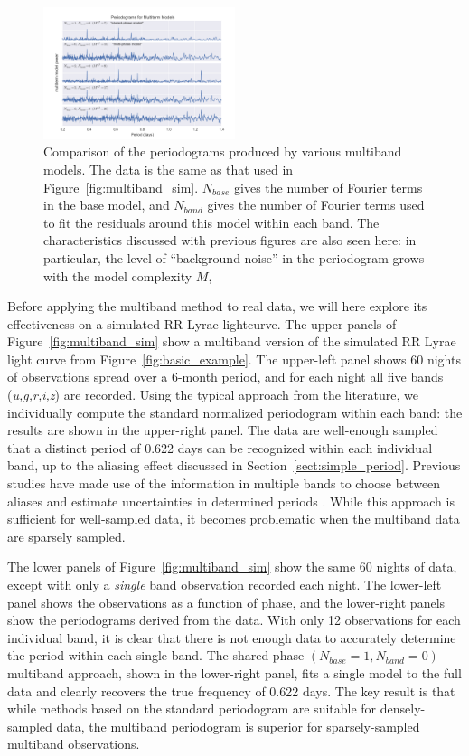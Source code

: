 \documentclass{emulateapj}
\newcommand{\Fig}[1]{Figure~\ref{fig:#1}}
\newcommand{\fig}[1]{\Fig{#1}}
\newcommand{\figlabel}[1]{\label{fig:#1}}
\newcommand{\Sect}[1]{Section~\ref{sect:#1}}
\newcommand{\sect}[1]{\Sect{#1}}
\newcommand{\new}[1]{{\color{red} #1}}
\begin{document}
\begin{figure}
  \centering
  \includegraphics[width=0.5\textwidth]{fig06.pdf}
  \caption{
    Comparison of the periodograms produced by various multiband models.
    The data is the same as that used in \fig{multiband_sim}. $N_{base}$ gives
    the number of Fourier terms in the base model, and $N_{band}$ gives the
    number of Fourier terms used to fit the residuals around this model within
    each band. The characteristics discussed with previous figures are also
    seen here: in particular, the level of ``background noise'' in the
    periodogram grows with the model complexity $M$,
  } 
  \figlabel{multiband_models}
\end{figure}

Before applying the multiband method to real data, we will here explore its effectiveness on a simulated RR Lyrae lightcurve.
The upper panels of \fig{multiband_sim} show a multiband version of the simulated RR Lyrae light curve from \fig{basic_example}.
The upper-left panel shows 60 nights of observations spread over a 6-month period, and for each night all five bands ({\it u,g,r,i,z}) are recorded.
Using the typical approach from the literature, we individually compute the standard normalized periodogram within each band: the results are shown in the upper-right panel.
The data are well-enough sampled that a distinct period of 0.622 days can be recognized within each individual band, up to the aliasing effect discussed in \sect{simple_period}.
Previous studies have made use of the information in multiple bands to choose between aliases and estimate uncertainties in determined periods \citep[e.g.][]{Sesar2010,Oluseyi12}.
While this approach is sufficient for well-sampled data, it becomes problematic when the multiband data are sparsely sampled.

The lower panels of \fig{multiband_sim} show the same 60 nights of data, except with only a {\it single} band observation recorded each night.
The lower-left panel shows the observations as a function of phase, and the lower-right panels show the periodograms derived from the data.
With only 12 observations for each individual band, it is clear that there is not enough data to accurately determine the period within each single band. The shared-phase $(N_{base}=1,N_{band}=0)$ multiband approach, shown in the lower-right panel, fits a single model to the full data and clearly recovers the true frequency of 0.622 days. \new{The key result is that while methods based on the standard periodogram are suitable for densely-sampled data, the multiband periodogram is superior for sparsely-sampled multiband observations.}
\end{document}
